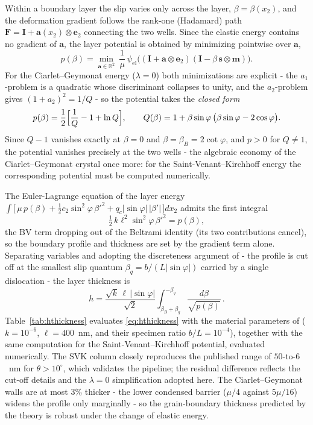 \documentclass[12pt]{article}
\theoremstyle{plain}
\theoremstyle{definition}
\newcommand{\bF}{\bm{F}}
\newcommand{\bs}{\bm{s}}
\newcommand{\bmm}{\bm{m}}
\newcommand{\bI}{\bm{I}}
\newcommand{\R}{\mathbb{R}}
\begin{document}
Within a boundary layer the slip varies only across the layer, $\beta=\beta(x_2)$,
and the deformation gradient follows the rank-one (Hadamard) path
$\bF=\bI+\bm{a}(x_2)\otimes\bm{e}_2$ connecting the two wells. Since the elastic
energy contains no gradient of $\bm{a}$, the layer potential is obtained by
minimizing pointwise over $\bm{a}$,
\begin{equation}\label{eq:pdef}
  p(\beta)=\min_{\bm{a}\in\R^2}\ \frac{1}{\mu}\,
  \psi_{\mathrm{el}}\bigl((\bI+\bm{a}\otimes\bm{e}_2)(\bI-\beta\,\bs\otimes\bmm)\bigr).
\end{equation}
For the Ciarlet--Geymonat energy ($\lambda=0$) both minimizations are explicit -
the $a_1$-problem is a quadratic whose discriminant collapses to unity, and the
$a_2$-problem gives $(1+a_2)^2=1/Q$ - so the potential takes the \emph{closed
form}
\begin{equation}\label{eq:pclosed}
  p(\beta)=\frac12\Bigl[\frac1Q-1+\ln Q\Bigr],\qquad
  Q(\beta)=1+\beta\sin\varphi\,\bigl(\beta\sin\varphi-2\cos\varphi\bigr).
\end{equation}
Since $Q-1$ vanishes exactly at
$\beta=0$ and $\beta=\beta_B=2\cot\varphi$, and $p>0$ for $Q\neq1$, the potential
vanishes precisely at the two wells - the algebraic economy of the
Ciarlet--Geymonat crystal once more: for the Saint-Venant--Kirchhoff energy the
corresponding potential must be computed numerically. 

The Euler-Lagrange equation of the layer energy
$\int\bigl[\,\mu\,p(\beta)+\tfrac12 c_2\sin^2\!\varphi\,\beta'^2
+q_c|\sin\varphi|\,|\beta'|\,\bigr]dx_2$ admits the first integral
\begin{equation}\label{eq:firstint}
  \tfrac12\,k\ell^2\sin^2\!\varphi\,\beta'^2=p(\beta),
\end{equation}
the BV term dropping out of the Beltrami identity (its two
contributions cancel), so the boundary profile and thickness are set by the
gradient term alone. Separating variables and adopting the discreteness argument
of \citet{koster2015bformation} - the profile is cut off at the smallest slip quantum
$\beta_q=b/(L|\sin\varphi|)$ carried by a single dislocation - the layer
thickness is
\begin{equation}\label{eq:hthickness}
  h=\frac{\sqrt{k}\,\ell\,|\sin\varphi|}{\sqrt2}
  \int_{\beta_B+\beta_q}^{-\beta_q}\frac{d\beta}{\sqrt{p(\beta)}}\,.
\end{equation}
Table~\ref{tab:hthickness} evaluates \eqref{eq:hthickness} with the material
parameters of \citet{koster2015bformation} ($k=10^{-6}$, $\ell=400$~nm, and their
specimen ratio $b/L=10^{-4}$),
together with the same computation for the Saint-Venant--Kirchhoff potential,
evaluated numerically. The SVK column closely reproduces the published range of
$50$-to-$6$~nm for $\theta>10^\circ$, which validates the
pipeline; the residual difference reflects the cut-off details and the
$\lambda=0$ simplification adopted here. The Ciarlet--Geymonat walls are at most
$3\%$ thicker - the lower condensed barrier ($\mu/4$ against $5\mu/16$) widens
the profile only marginally - so the grain-boundary thickness predicted by the
theory is robust under the change of elastic energy.
\end{document}
